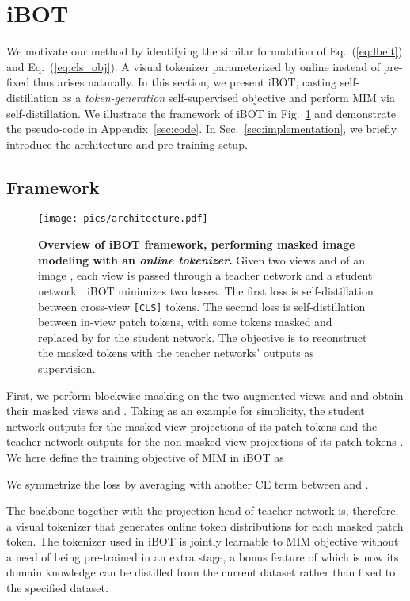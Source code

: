 \documentclass{article} \usepackage{iclr2022_conference,times}
\def\ourmethod{{iBOT}\xspace}
\begin{document}
\section{\ourmethod}

We motivate our method by identifying the similar formulation of Eq.~(\ref{eq:lbeit}) and Eq.~(\ref{eq:cls_obj}). A visual tokenizer parameterized by online  instead of pre-fixed  thus arises naturally.
In this section, we present \ourmethod, casting self-distillation as a \textit{token-generation} self-supervised objective and perform MIM via self-distillation. We illustrate the framework of \ourmethod in Fig.~\ref{fig:architecture} and demonstrate the pseudo-code in Appendix~\ref{sec:code}. In Sec.~\ref{sec:implementation}, we briefly introduce the architecture and pre-training setup. 

\subsection{Framework}

\begin{figure}[!t]
\centering
\texttt{[image: pics/architecture.pdf]}
\vspace{-0.1cm}
\caption{\textbf{Overview of \ourmethod framework, performing masked image modeling with an \textit{online tokenizer}.} 
Given two views  and  of an image , each  view is passed through a teacher network  and a student network . \ourmethod minimizes two losses. The first loss  is self-distillation between cross-view \texttt{[CLS]} tokens.
The second loss  is self-distillation between in-view patch tokens, with some tokens masked and replaced by  for the student network. The objective is to reconstruct the masked tokens with the teacher networks' outputs as supervision.
}
\vspace{-0.4cm}
\label{fig:architecture}
\end{figure}

First, we perform blockwise masking \citep{beit} on the two augmented views  and  and obtain their masked views  and .
Taking  as an example for simplicity, the student network outputs for the masked view  projections of its patch tokens  and the teacher network outputs for the non-masked view  projections of its patch tokens . 
We here define the training objective of MIM in \ourmethod as 

We symmetrize the loss by averaging with another CE term between  and .

The backbone together with the projection head of teacher network  is, therefore, a visual tokenizer that generates online token distributions for each masked patch token. 
The tokenizer used in \ourmethod is jointly learnable to MIM objective without a need of being pre-trained in an extra stage, a bonus feature of which is now its domain knowledge can be distilled from the current dataset rather than fixed to the specified dataset.
\end{document}

